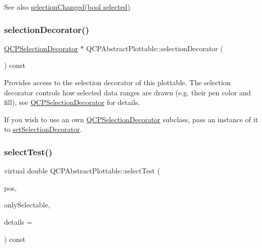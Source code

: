 \begin{DoxySeeAlso}{See also}
\hyperlink{classQCPAbstractPlottable_a3af66432b1dca93b28e00e78a8c7c1d9}{selection\+Changed(bool selected)} 
\end{DoxySeeAlso}
\mbox{\label{classQCPAbstractPlottable_a7861518e47ca0c6a0c386032c2db075e}} 
\subsubsection{\texorpdfstring{selection\+Decorator()}{selectionDecorator()}}
{\footnotesize\ttfamily \hyperlink{classQCPSelectionDecorator}{Q\+C\+P\+Selection\+Decorator} $\ast$ Q\+C\+P\+Abstract\+Plottable\+::selection\+Decorator (\begin{DoxyParamCaption}{ }\end{DoxyParamCaption}) const\hspace{0.3cm}{\ttfamily [inline]}}

Provides access to the selection decorator of this plottable. The selection decorator controls how selected data ranges are drawn (e.\+g. their pen color and fill), see \hyperlink{classQCPSelectionDecorator}{Q\+C\+P\+Selection\+Decorator} for details.

If you wish to use an own \hyperlink{classQCPSelectionDecorator}{Q\+C\+P\+Selection\+Decorator} subclass, pass an instance of it to \hyperlink{classQCPAbstractPlottable_a20e266ad646f8c4a7e4631040510e5d9}{set\+Selection\+Decorator}. \mbox{\label{classQCPAbstractPlottable_addb3f5c41f007a78c3e142cc605bc712}} 
\subsubsection{\texorpdfstring{select\+Test()}{selectTest()}}
{\footnotesize\ttfamily virtual double Q\+C\+P\+Abstract\+Plottable\+::select\+Test (\begin{DoxyParamCaption}\item[{const Q\+PointF \&}]{pos,  }\item[{bool}]{only\+Selectable,  }\item[{Q\+Variant $\ast$}]{details = {} }\end{DoxyParamCaption}) const\hspace{0.3cm}{\ttfamily [pure virtual]}}

